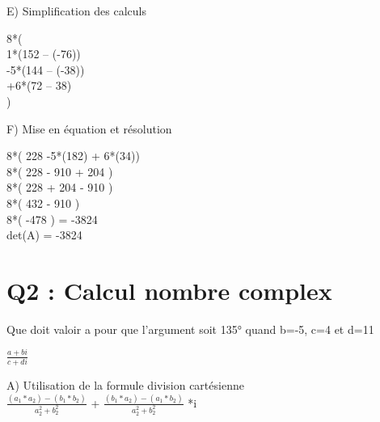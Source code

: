 E) Simplification des calculs

\vspace{5mm} %

8*(\\

  1*(152 – (-76))\\

  -5*(144 – (-38))\\

  +6*(72 – 38)\\

)

\vspace{10mm} %


F) Mise en équation et résolution \\

\vspace{5mm} %

8*( 228 -5*(182) + 6*(34))\\

8*( 228 - 910 + 204 )\\

8*( 228 + 204 - 910 )\\

8*( 432 - 910 )\\

8*( -478 ) = -3824\\

det(A) = -3824\\


\newpage

\section{Q2 : Calcul nombre complex}

\vspace{4mm} %

Que doit valoir a pour que l’argument soit 135° quand b=-5, c=4 et d=11 \\

\vspace{4mm} %

$\frac{a+bi}{c+di}$

\vspace{10mm} %

A) Utilisation de la formule division cartésienne\\

$\frac{(a_1 * a_2) - (b_1*b_2)} {a_{2}^{2}+b_{2}^{2} } $ + $\frac{(b_1 * a_2) - (a_1*b_2)} {a_{2}^{2}+b_{2}^{2} } $ *i \\

